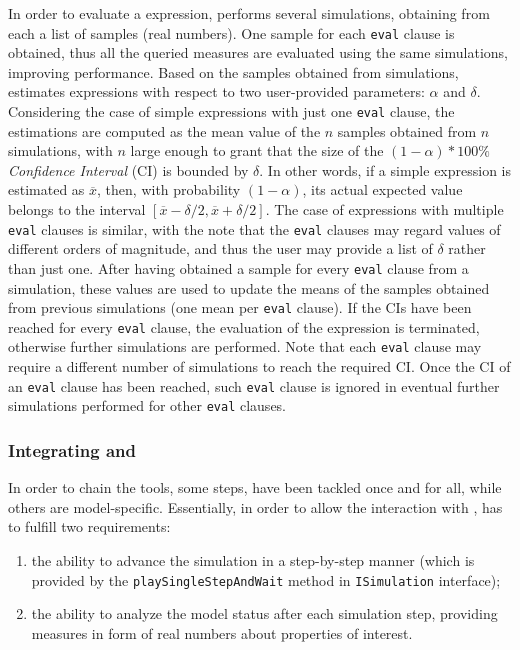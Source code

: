 \documentclass[12pt,a4paper,twoside,openright]{book}
\begin{document}
In order to evaluate a \multiquatex{} expression, \multivesta{} performs several simulations, obtaining from each a list of samples (real numbers).
%
One sample for each \texttt{eval} clause is obtained, thus all the queried measures are evaluated using the same simulations, improving performance.
%
Based on the samples obtained from simulations, \multivesta{} estimates \multiquatex{} expressions with respect to two user-provided parameters: $\alpha$ and $\delta$. 
%
Considering the case of simple expressions with just one \texttt{eval} clause, the estimations are computed as the mean value of the $n$ samples obtained from $n$ simulations, with $n$ large enough to grant that the size of the $(1 - \alpha)*100\%$  \textit{Confidence Interval} (CI) is bounded by $\delta$.
%
In other words, if a simple \multiquatex{} expression is estimated as $\overline{x}$, then, with probability $(1 - \alpha)$, its actual expected value belongs to the interval $[\overline{x} - \delta/2,\overline{x} + \delta/2]$.
%
The case of expressions with multiple \texttt{eval} clauses is similar, with the note that the \texttt{eval} clauses may regard values of different orders of magnitude, and thus the user may provide a list of $\delta$ rather than just one. 
%
After having obtained a sample for every \texttt{eval} clause from a simulation, these values are used to update the means of the samples obtained from previous simulations (one mean per \texttt{eval} clause). If the CIs have been reached for every \texttt{eval} clause, the evaluation of the expression is terminated, otherwise further simulations are performed.
%
Note that each \texttt{eval} clause may require a different number of simulations to reach the required CI. Once the CI of an \texttt{eval} clause has been reached, such \texttt{eval} clause is ignored in eventual further simulations performed for other \texttt{eval} clauses. 


\subsubsection{Integrating \multivesta{} and \alchemist{}}

In order to chain the tools, some steps, have been tackled once and for all, while others are model-specific.
%
Essentially, in order to allow the interaction with \multivesta{}, \alchemist{} has to fulfill two requirements:
\begin{enumerate}
 \item the ability to advance the simulation in a step-by-step manner (which is provided by the \texttt{playSingleStepAndWait} method in \texttt{ISimulation} interface);
 \item the ability to analyze the model status after each simulation step, providing measures in form of real numbers about properties of interest.
\end{enumerate}
\end{document}
